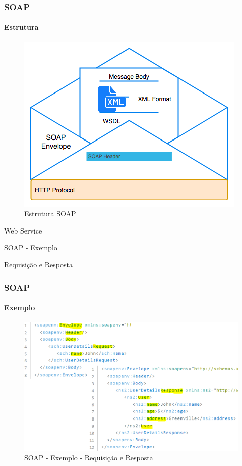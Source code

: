 \documentclass[
	9pt, %
	t, %
]{beamer}
\begin{document}
\begin{frame}
	\frametitle{SOAP}
	\framesubtitle{Estrutura}
	
	\begin{figure}
		\centering
		\includegraphics[width=0.7\linewidth]{soap_structure.png}
		\caption{Estrutura SOAP}
		\label{fig:soap}
	\end{figure}

\end{frame}

\begin{frame}
	\begin{center}
		
		\bigskip\bigskip\bigskip\bigskip %
		{\Large Web Service}
		
		\bigskip\bigskip %
		{\Huge SOAP - Exemplo}
		
		\smallskip
		{\small Requisição e Resposta} 
	\end{center}

\end{frame}

\begin{frame}
	\frametitle{SOAP}
	\framesubtitle{Exemplo}
	
	\begin{figure}
		\includegraphics[width=0.8\linewidth]{soap_example_user.png}
		\caption{SOAP - Exemplo - Requisição e Resposta}
		\label{fig:soap_example_user}
	\end{figure}

\end{frame}
\end{document}

